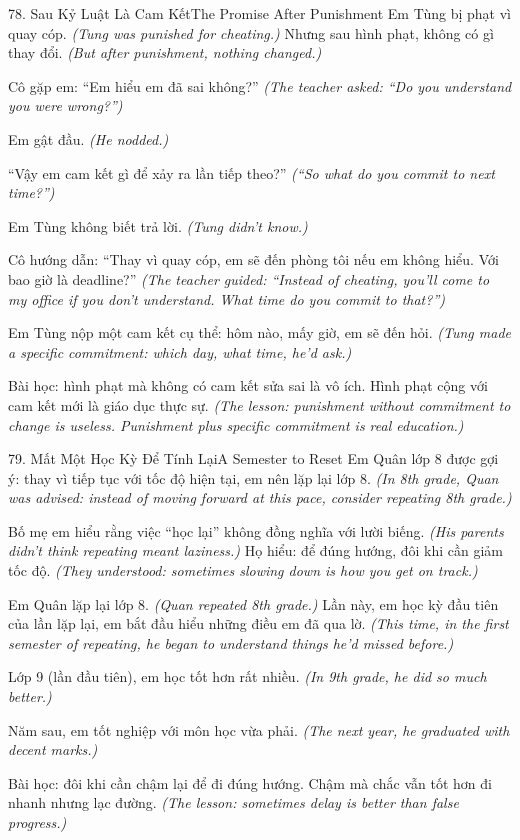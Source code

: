 \begin{truyen}{78. Sau Kỷ Luật Là Cam Kết}{The Promise After Punishment}
Em Tùng bị phạt vì quay cóp.
\textit{(Tung was punished for cheating.)}
Nhưng sau hình phạt, không có gì thay đổi.
\textit{(But after punishment, nothing changed.)}

Cô gặp em: ``Em hiểu em đã sai không?''
\textit{(The teacher asked: ``Do you understand you were wrong?'')}

Em gật đầu.
\textit{(He nodded.)}

``Vậy em cam kết gì để xảy ra lần tiếp theo?''
\textit{(``So what do you commit to next time?'')}

Em Tùng không biết trả lời.
\textit{(Tung didn't know.)}

Cô hướng dẫn: ``Thay vì quay cóp, em sẽ đến phòng tôi nếu em không hiểu. Với bao giờ là deadline?''
\textit{(The teacher guided: ``Instead of cheating, you'll come to my office if you don't understand. What time do you commit to that?'')}

Em Tùng nộp một cam kết cụ thể: hôm nào, mấy giờ, em sẽ đến hỏi.
\textit{(Tung made a specific commitment: which day, what time, he'd ask.)}

Bài học: hình phạt mà không có cam kết sửa sai là vô ích. Hình phạt cộng với cam kết mới là giáo dục thực sự.
\textit{(The lesson: punishment without commitment to change is useless. Punishment plus specific commitment is real education.)}
\end{truyen}

\begin{truyen}{79. Mất Một Học Kỳ Để Tính Lại}{A Semester to Reset}
Em Quân lớp 8 được gợi ý: thay vì tiếp tục với tốc độ hiện tại, em nên lặp lại lớp 8.
\textit{(In 8th grade, Quan was advised: instead of moving forward at this pace, consider repeating 8th grade.)}

Bố mẹ em hiểu rằng việc ``học lại'' không đồng nghĩa với lười biếng.
\textit{(His parents didn't think repeating meant laziness.)}
Họ hiểu: để đúng hướng, đôi khi cần giảm tốc độ.
\textit{(They understood: sometimes slowing down is how you get on track.)}

Em Quân lặp lại lớp 8.
\textit{(Quan repeated 8th grade.)}
Lần này, em học kỳ đầu tiên của lần lặp lại, em bắt đầu hiểu những điều em đã qua lờ.
\textit{(This time, in the first semester of repeating, he began to understand things he'd missed before.)}

Lớp 9 (lần đầu tiên), em học tốt hơn rất nhiều.
\textit{(In 9th grade, he did so much better.)}

Năm sau, em tốt nghiệp với môn học vừa phải.
\textit{(The next year, he graduated with decent marks.)}

Bài học: đôi khi cần chậm lại để đi đúng hướng. Chậm mà chắc vẫn tốt hơn đi nhanh nhưng lạc đường.
\textit{(The lesson: sometimes delay is better than false progress.)}
\end{truyen}

